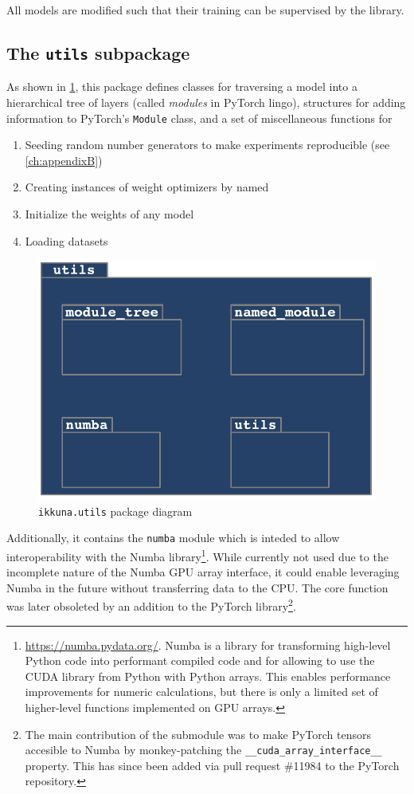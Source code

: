 All models are modified such that their training can be supervised by
the library.

\hypertarget{sec:pack-utils}{%
\subsection{The \texttt{utils} subpackage}\label{sec:pack-utils}}

As shown in \cref{fig:pack-diag-utils}, this package defines classes for
traversing a model into a hierarchical tree of layers (called \emph{modules} in
PyTorch lingo), structures for adding information to PyTorch's \texttt{Module}
class, and a set of miscellaneous functions for

\begin{enumerate}
    \item
        Seeding random number generators to make experiments reproducible (see
        \cref{ch:appendixB})
    \item
        Creating instances of weight optimizers by named
    \item
        Initialize the weights of any model
    \item
        Loading datasets
\end{enumerate}

\begin{figure}
    \hypertarget{fig:pack-diag-utils}{%
        \centering
        \includegraphics[max width=.5\textwidth]{gfx/diagrams/class_diagrams/utils_package_diagram.pdf}
        \caption{\texttt{ikkuna.utils} package diagram}\label{fig:pack-diag-utils}
    }
\end{figure}

Additionally, it contains the \texttt{numba} module
which is inteded to allow interoperability with the Numba
library\footnote{\url{https://numba.pydata.org/}. Numba is a library for
    transforming high-level Python code into performant compiled code and
    for allowing to use the CUDA library from Python with Python arrays.
    This enables performance improvements for numeric calculations, but
    there is only a limited set of higher-level functions implemented on
GPU arrays.}. While currently not used due to the incomplete nature of
the Numba GPU array interface, it could enable leveraging Numba in the
future without transferring data to the CPU. The core function was later
obsoleted by an addition to the PyTorch library\footnote{The main contribution
of the submodule was to make PyTorch tensors accesible to Numba by
monkey-patching the \lstinline{__cuda_array_interface__} property. This has since
been added via pull request \#11984 to the PyTorch repository.}.

